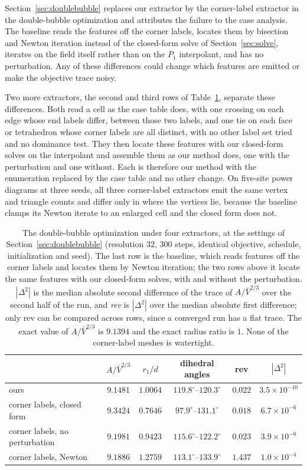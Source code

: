 \documentclass[11pt]{article}
\theoremstyle{definition}
\begin{document}
Section~\ref{sec:doublebubble} replaces our extractor by the corner-label
extractor in the double-bubble optimization and attributes the failure to
the case analysis. The baseline reads the features off the corner labels,
locates them by bisection and Newton iteration instead of the closed-form
solve of Section~\ref{sec:solve}, iterates on the field itself rather than
on the $P_1$ interpolant, and has no perturbation. Any of these differences
could change which features are emitted or make the objective trace noisy.

Two more extractors, the second and third rows of Table~\ref{tab:ablation},
separate these differences. Both read a cell as the case table does, with one
crossing on each edge whose end labels differ, between those two labels, and
one tie on each face or tetrahedron whose corner labels are all distinct,
with no other label set tried and no dominance test. They then locate these
features with our closed-form solves on the interpolant and assemble them as
our method does, one with the perturbation and one without. Each is
therefore our method with the enumeration replaced by the case table and
no other change. On five-site power diagrams at three seeds, all three
corner-label extractors emit the same vertex and triangle counts and differ
only in where the vertices lie, because the baseline clamps its Newton
iterate to an enlarged cell and the closed form does not.

\begin{table}[htbp]
\centering
\caption{The double-bubble optimization under four extractors, at the settings
of Section~\ref{sec:doublebubble} (resolution $32$, $300$ steps, identical
objective, schedule, initialization and seed). The last row is the
baseline, which reads features off the corner labels and locates them by
Newton iteration; the two rows above it locate the same features with our
closed-form solves, with and without the perturbation. $|\Delta^2|$ is the median
absolute second difference of the trace of $A/\bar V^{2/3}$ over the second
half of the run, and \emph{rev} is $|\Delta^2|$ over the median absolute first
difference; only rev can be compared across rows, since a converged run has
a flat trace.
The exact value of $A/\bar V^{2/3}$ is $9.1394$ and the exact radius ratio
is $1$. None of the corner-label meshes is watertight.}
\label{tab:ablation}
\small
\begin{tabular}{@{}lccccc@{}}
\toprule
& $A/\bar V^{2/3}$ & $r_1/d$ & dihedral angles & rev & $|\Delta^2|$ \\
\midrule
ours                       & $9.1481$ & $1.0064$ & $119.8^\circ$--$120.3^\circ$ & $0.022$ & $3.5\!\times\!10^{-10}$ \\
corner labels, closed form & $9.3424$ & $0.7646$ & $97.9^\circ$--$131.1^\circ$ & $0.018$ & $6.7\!\times\!10^{-6}$ \\
corner labels, no perturbation & $9.1981$ & $0.9423$ & $115.6^\circ$--$122.2^\circ$ & $0.023$ & $3.9\!\times\!10^{-6}$ \\
corner labels, Newton      & $9.1886$ & $1.2759$ & $113.1^\circ$--$133.9^\circ$ & $1.437$ & $1.0\!\times\!10^{-4}$ \\
\bottomrule
\end{tabular}
\end{table}
\end{document}
